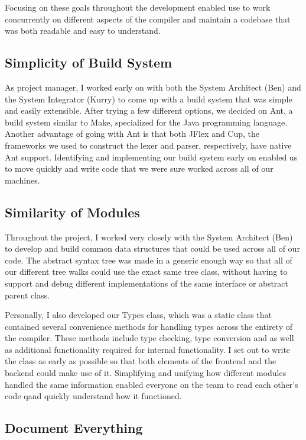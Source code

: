 \documentclass{book}
\begin{document}
Focusing on these goals throughout the development enabled use to work concurrently
on different aspects of the compiler and maintain a codebase that was both readable
and easy to understand.  

\subsection{Simplicity of Build System}

As project manager, I worked early on with both the System Architect (Ben) and
the System Integrator (Kurry) to come up with a build system that was simple and
easily extensible. After trying a few different options, we decided on Ant,
a build system similar to Make, specialized for the Java programming language.
Another advantage of going with Ant is that both JFlex and Cup, the frameworks
we used to construct the lexer and parser, respectively, have native Ant support.
Identifying and implementing our build system early on enabled us to move quickly
and write code that we were sure worked across all of our machines. 

\subsection{Similarity of Modules}

Throughout the project, I worked very closely with the System Architect (Ben) to
develop and build common data structures that could be used across all of our
code. The abstract syntax tree was made in a generic enough way so that all
of our different tree walks could use the exact same tree class, without having
to support and debug different implementations of the same interface or abstract
parent class.  

Personally, I also developed our Types class, which was a static class that
contained several convenience methods for handling types across the entirety
of the compiler. These methods include type checking, type conversion and
as well as additional functionality required for internal functionality. I
set out to write the class as early as possible so that both elements of
the frontend and the backend could make use of it. Simplifying and unifying how
different modules handled the same information enabled everyone on the team to
read each other's code qand quickly understand how it functioned.

\subsection{Document Everything}
\end{document}
